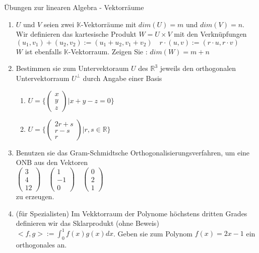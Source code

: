 \documentclass[a4paper]{article}
\begin{document}
Übungen zur linearen Algebra - Vektorräume
\begin{enumerate}
\item $U$ und $V$ seien zwei $\mathbb K$-Vektorräume mit $dim(U) = m$ und $dim(V) = n$. Wir definieren das kartesische Produkt $W = U \times V$ mit den Verknüpfungen \\
$( u_1, v_1) + ( u_2, v_2 ) := ( u_1 + u_2, v_1 + v_2) \quad r\cdot( u, v ) := ( r\cdot u, r \cdot v ) $ \\
$W$ ist ebenfalls $\mathbb K$-Vektorraum. Zeigen Sie : $dim( W ) = m + n$
\item Bestimmen sie zum Untervektoraum $U$ des $\mathbb R^3$ jeweils den orthogonalen Untervektorraum $U^\perp$ durch Angabe einer Basis
\begin{enumerate}
\item $ U = \{ \begin{pmatrix} x \\ y \\ z \end{pmatrix} | x +  y - z = 0 \} $
\item $ U = \{ \begin{pmatrix} 2r + s \\ r - s \\ r  \end{pmatrix}  | r, s \in \mathbb R \}  $
\end{enumerate}
\item Benutzen sie das Gram-Schmidtsche Orthogonalisierungsverfahren, um eine ONB aus den Vektoren \\
$\begin{pmatrix} 3 \\ 4 \\ 12  \end{pmatrix} \quad  \begin{pmatrix} 1 \\ -1 \\ 0  \end{pmatrix}  \quad \begin{pmatrix} 0 \\ 2 \\ 1  \end{pmatrix} $\\
zu erzeugen.
\item (für Spezialisten) Im Vekktorraum der Polynome höchstens dritten Grades definieren wir das Sklarprodukt (ohne Beweis)
$< f, g > := \int_0^1 f(x) g(x) dx$. Geben sie zum Polynom $f(x) = 2x -1$ ein orthogonales an.  
\end{enumerate}
\end{document}
